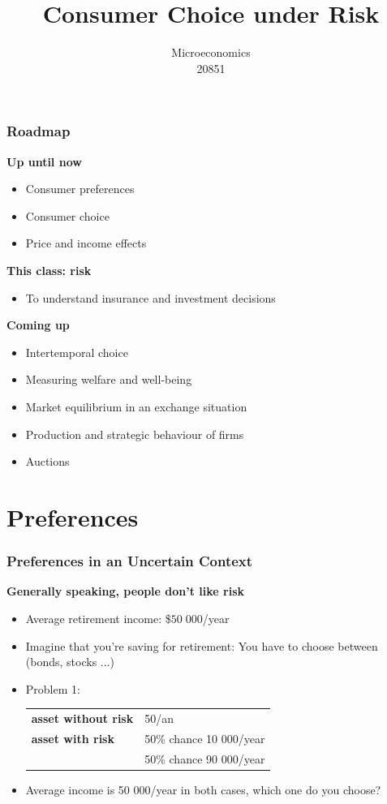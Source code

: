 \documentclass[handout]{beamer}
\title{Consumer Choice under Risk}
\author{Microeconomics \\ 20851}
\date{}
\newenvironment{iPar}[1]{\textbf{#1} \begin{itemize}}{\end{itemize}}
\newcommand{\mdp}{\medskip \pause}
\begin{document}
\frame{\titlepage}

\section[Outline]{}
\frame{\tableofcontents}

\section{}


\begin{frame}\frametitle{Roadmap}

\begin{iPar}{Up until now}
\item Consumer preferences
\item Consumer choice
\item Price and income effects
\end{iPar}\mdp

\begin{iPar}{This class: risk}
\item To understand insurance and investment decisions
\end{iPar}\mdp

\begin{iPar}{Coming up}
\item Intertemporal choice
\item Measuring welfare and well-being
\item Market equilibrium in an exchange situation
\item Production and strategic behaviour of firms
\item Auctions
\end{iPar}
\end{frame}

\section{Preferences}

\begin{frame}\frametitle{Preferences in an Uncertain Context}

\begin{iPar}{Generally speaking, people don't like risk}\item Average retirement income: \$$50 \; 000$/year \item  Imagine that you're saving for retirement:
You have to choose between (bonds, stocks ...) \item Problem
1: \begin{tabular}{ll} \textbf{asset without risk} & 50\; 000/an\\
\textbf{asset with risk} & 50\% chance  10 000/year \\ & 50\%  chance  90
000/year\end{tabular} \medskip \item Average income is 50 000/year in both cases, which one do you choose? \end{iPar}

\end{frame}
\end{document}
